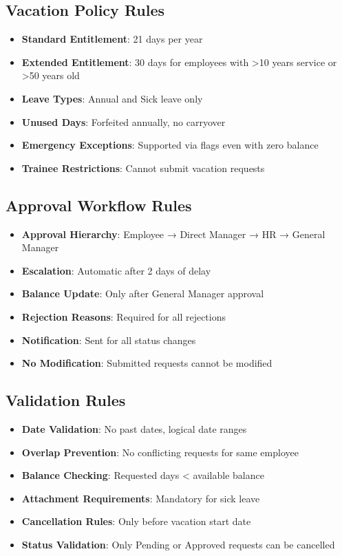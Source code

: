 \documentclass[12pt,a4paper]{article}
\begin{document}
\subsection{Vacation Policy Rules}
\begin{itemize}
    \item \textbf{Standard Entitlement}: 21 days per year
    \item \textbf{Extended Entitlement}: 30 days for employees with >10 years service or >50 years old
    \item \textbf{Leave Types}: Annual and Sick leave only
    \item \textbf{Unused Days}: Forfeited annually, no carryover
    \item \textbf{Emergency Exceptions}: Supported via flags even with zero balance
    \item \textbf{Trainee Restrictions}: Cannot submit vacation requests
\end{itemize}

\subsection{Approval Workflow Rules}
\begin{itemize}
    \item \textbf{Approval Hierarchy}: Employee → Direct Manager → HR → General Manager
    \item \textbf{Escalation}: Automatic after 2 days of delay
    \item \textbf{Balance Update}: Only after General Manager approval
    \item \textbf{Rejection Reasons}: Required for all rejections
    \item \textbf{Notification}: Sent for all status changes
    \item \textbf{No Modification}: Submitted requests cannot be modified
\end{itemize}

\subsection{Validation Rules}
\begin{itemize}
    \item \textbf{Date Validation}: No past dates, logical date ranges
    \item \textbf{Overlap Prevention}: No conflicting requests for same employee
    \item \textbf{Balance Checking}: Requested days < available balance
    \item \textbf{Attachment Requirements}: Mandatory for sick leave
    \item \textbf{Cancellation Rules}: Only before vacation start date
    \item \textbf{Status Validation}: Only Pending or Approved requests can be cancelled
\end{itemize}
\end{document}
